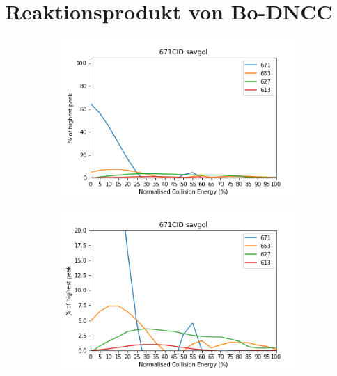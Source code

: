 \pagebreak
\section{Reaktionsprodukt von Bo-DNCC}

\begin{figure}[!htbp]
  \begin{subfigure}[b]{0.5\textwidth}
    \includegraphics[width=\textwidth]{content/Anhang/MSLeafspray/RP_Bo-DNCC/671CID-671savgol.png}
    \caption{}
  \end{subfigure}
  \hfill
  \begin{subfigure}[b]{0.5\textwidth}
    \includegraphics[width=\textwidth]{content/Anhang/MSLeafspray/RP_Bo-DNCC/671CID-671savgolv20.png}
    \caption{}
  \end{subfigure}
  

\end{figure}
